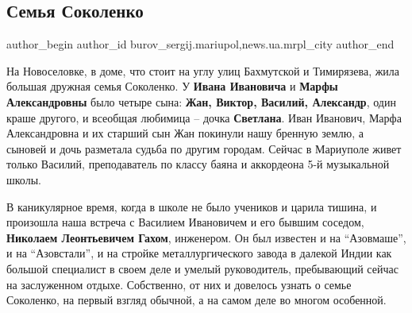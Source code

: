  
 
 
 
 
 
\subsection{Семья Соколенко}
\label{sec:07_07_2018.stz.news.ua.mrpl_city.1.semja_sokolenko}
 
\ifcmt
 author_begin
   author_id burov_sergij.mariupol,news.ua.mrpl_city
 author_end
\fi


На Новоселовке, в доме, что стоит на углу улиц Бахмутской и Тимирязева, жила
большая дружная семья Соколенко. У \textbf{Ивана Ивановича} и \textbf{Марфы Александровны} было
четыре сына: \textbf{Жан, Виктор, Василий, Александр}, один краше другого, и всеобщая
любимица – дочка \textbf{Светлана}. Иван Иванович, Марфа Александровна и их старший сын
Жан покинули нашу бренную землю, а сыновей и дочь разметала судьба по другим
городам. Сейчас в Мариуполе живет только Василий, преподаватель по классу баяна
и аккордеона 5-й музыкальной школы.


В каникулярное время, когда в школе не было учеников и царила тишина, и
произошла наша встреча с Василием Ивановичем и его бывшим соседом, \textbf{Николаем
Леонтьевичем Гахом}, инженером. Он был известен и на \enquote{Азовмаше}, и на
\enquote{Азовстали}, и на стройке металлургического завода в далекой Индии как
большой специалист в своем деле и умелый руководитель, пребывающий сейчас на
заслуженном отдыхе. Собственно, от них и довелось узнать о семье Соколенко, на
первый взгляд обычной, а на самом деле во многом особенной.

